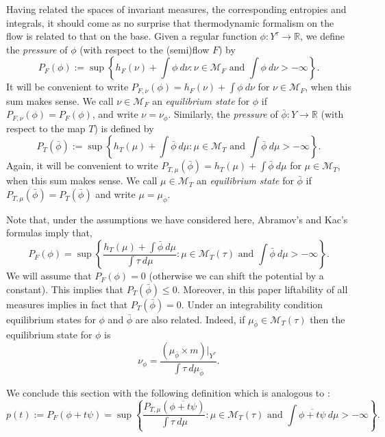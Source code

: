 \documentclass[12pt]{article}
\numberwithin{equation}{section}
\newcommand{\M}{\mathcal{M}}
\newcommand{\R}{\mathbb{R}}
\begin{document}
Having related the spaces of invariant measures, the corresponding entropies and  integrals, it should come as no surprise that thermodynamic formalism on the flow is related to that on the base.  Given  a regular function $\phi:Y^{\tau}  \to \R$, we define the \emph{pressure} of $\phi$ (with respect to the (semi)flow $F$)  by
\begin{equation*}
P_F(\phi) := \sup\left\{h_F(\nu)+ \int\phi~d\nu: \nu\in \M_F \text{ and } \int\phi~d\nu>-\infty \right\}.
\end{equation*}
It will be convenient to write $P_{F, \nu}(\phi) = h_F(\nu)+ \int\phi~d\nu$ for $\nu\in \M_F$, when this sum makes sense. 
We call $\nu\in \M_F$ an \emph{equilibrium state} for $\phi$ if $P_{F, \nu}(\phi)= P_F(\phi)$, and write $\nu=\nu_\phi$.
Similarly, the \emph{pressure} of $\bar\phi : Y \to \R$  (with respect to the map $T$) is defined by
\begin{equation*}
P_T(\bar\phi) := \sup\left\{h_T(\mu)+ \int\bar\phi~d\mu: \mu\in \M_T \text{ and } \int\bar\phi~d\mu>-\infty \right\}.
\end{equation*}
Again, it will be convenient to write $P_{T,\mu}(\bar\phi) = h_T(\mu)+ \int\bar\phi~d\mu$ for $\mu\in \M_T$, 
when this sum makes sense. We call $\mu\in \M_T$ an \emph{equilibrium state} for $\bar\phi$ if $P_{T, \mu}(\bar\phi)= P_T(\bar\phi)$ 
and write $\mu=\mu_{\bar\phi}$. 

\begin{rmk}
 Note that, under the assumptions we have considered here, Abramov's and Kac's formulas imply that,
\begin{equation*}
P_F(\phi)=\sup\left\{\frac{h_T(\mu)+ \int\bar\phi~d\mu}{\int\tau~d\mu}: \mu\in \M_T(\tau) \text{ and } \int\bar\phi~d\mu>-\infty \right\}.
\end{equation*}
We will assume that $P_F(\phi)=0$ (otherwise we can shift the potential by a constant). This implies that $P_T(\bar\phi)\le 0$. Moreover, in this paper liftability of all measures implies in fact that  $P_T(\bar\phi)=0$. Under an integrability condition equilibrium states for $\phi$ and $\bar\phi$ are also related. Indeed, if $\mu_{\bar\phi}\in \M_T(\tau)$ then the equilibrium state for $\phi$ is
\begin{equation*}
\nu_\phi= \frac{(\mu_{\bar\phi} \times m)|_{Y^\tau} }{\int\tau~d\mu_{\bar\phi}}.
\end{equation*}
\end{rmk}


We conclude this section  with the following definition which is analogous to \cite[Definition 3.1]{RuhSar22}:
\begin{equation*}
p(t) := P_F(\phi+t\psi) = \sup\left\{\frac{P_{T, \mu}(\overline{\phi+t\psi})}{\int\tau~d\mu}:\mu\in \M_T(\tau) \text{ and } \int\overline{\phi+t\psi}~d\mu>-\infty\right\}.
\end{equation*}
\end{document}
